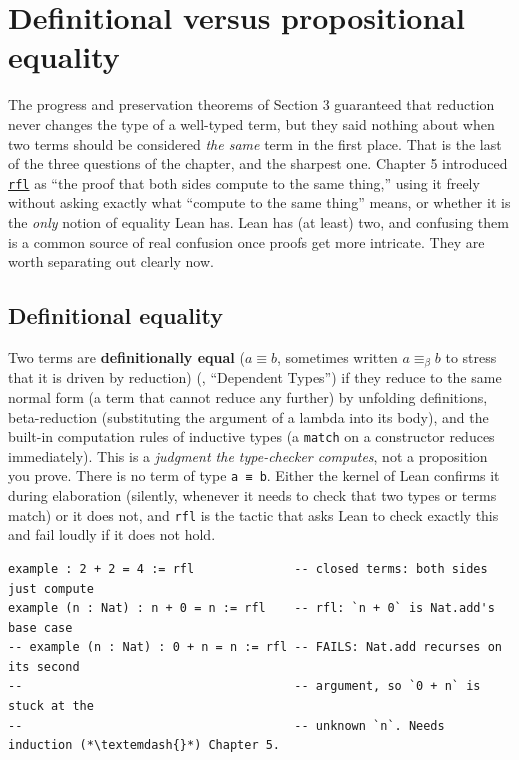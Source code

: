 \section{Definitional versus propositional equality}\label{sec:06-rigor-check:04-defeq-vs-propeq:1}

The progress and preservation theorems of Section 3 guaranteed that reduction never changes the type of a well-typed term, but they said nothing about when two terms should be considered \emph{the same} term in the first place. That is the last of the three questions of the chapter, and the sharpest one. Chapter 5 introduced \href{https://lean-lang.org/doc/reference/latest/Tactic-Proofs/Tactic-Reference/}{\texttt{rfl}} as ``the proof that both sides compute to the same thing,'' using it freely without asking exactly what ``compute to the same thing'' means, or whether it is the \emph{only} notion of equality Lean has. Lean has (at least) two, and confusing them is a common source of real confusion once proofs get more intricate. They are worth separating out clearly now.

\subsection{Definitional equality}\label{sec:06-rigor-check:04-defeq-vs-propeq:2}

Two terms are \textbf{definitionally equal} (\(a \equiv b\), sometimes written \(a \equiv_\beta b\) to stress that it is driven by reduction) (\cite{TPIL4}, ``Dependent Types'') if they reduce to the same normal form (a term that cannot reduce any further) by unfolding definitions, beta-reduction (substituting the argument of a lambda into its body), and the built-in computation rules of inductive types (a \texttt{match} on a constructor reduces immediately). This is a \emph{judgment the type-checker computes}, not a proposition you prove. There is no term of type \texttt{a ≡ b}. Either the kernel of Lean confirms it during elaboration (silently, whenever it needs to check that two types or terms match) or it does not, and \texttt{rfl} is the tactic that asks Lean to check exactly this and fail loudly if it does not hold.

\begin{lstlisting}
example : 2 + 2 = 4 := rfl              -- closed terms: both sides just compute
example (n : Nat) : n + 0 = n := rfl    -- rfl: `n + 0` is Nat.add's base case
-- example (n : Nat) : 0 + n = n := rfl -- FAILS: Nat.add recurses on its second
--                                      -- argument, so `0 + n` is stuck at the
--                                      -- unknown `n`. Needs induction (*\textemdash{}*) Chapter 5.
\end{lstlisting}

